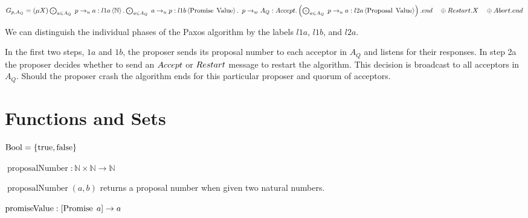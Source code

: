 $G_{p, A_Q} = \left(\mu X\right) \bigodot_{a \in A_Q}\; p \to_u a : l1a \left\langle \mathbb{N} \right\rangle . \bigodot_{a \in A_Q}\; a \to_u p : l1b \left\langle \operatorname{Promise}\; \operatorname{Value} \right\rangle .\\
\hspace*{0.5em}p \to_w A_Q : \mathnormal{Accept}.\left(\bigodot_{a \in A_Q}\; p \to_u a : l2a \left\langle \operatorname{Proposal}\; \operatorname{Value} \right\rangle\right).end\\
\hspace*{1em}\oplus \mathnormal{Restart}.X\\
\hspace*{1em}\oplus \mathnormal{Abort}.end$

We can distinguish the individual phases of the Paxos algorithm by the labels $l1a$, $l1b$, and $l2a$.

In the first two steps, $1a$ and $1b$, the proposer sends its proposal number to each acceptor in $A_Q$ and listens for their responses.
In step 2a the proposer decides whether to send an $\mathnormal{Accept}$ or $\mathnormal{Restart}$ message to restart the algorithm.
This decision is broadcast to all acceptors in $A_Q$.
Should the proposer crash the algorithm ends for this particular proposer and quorum of acceptors.

\section{Functions and Sets}
\newcommand{\Bool}[0]{\operatorname{Bool}}
\newcommand{\True}[0]{\operatorname{true}}
\newcommand{\False}[0]{\operatorname{false}}
\newcommand{\prNumber}[2]{\operatorname{proposalNumber}\left( #1, #2 \right)}
\newcommand{\promValue}[1]{\operatorname{promiseValue}\left(#1\right)}
\newcommand{\anyNack}[1]{\operatorname{anyNack}\left(#1\right)}
\newcommand{\promCount}[1]{\operatorname{promiseCount}\left(#1\right)}
\newcommand{\greaterThan}[2]{\operatorname{gt}\left(#1, #2\right)}
\newcommand{\greaterEqual}[2]{\operatorname{ge}\left(#1, #2\right)}
\newcommand{\nFromPr}[1]{\operatorname{nFromProposal}\left(#1 \right)}
\newcommand{\genAq}[3]{\operatorname{genA_Q}\left(#1, #2, #3\right)}
\newcommand{\update}[2]{\operatorname{update} \left(#1, #2\right)}

$\Bool = \Curly{\True, \False}$

$\operatorname{proposalNumber} : \mathbb{N} \times \mathbb{N} \to \mathbb{N}$

$\prNumber{a}{b}$ returns a proposal number when given two natural numbers.

$\operatorname{promiseValue} : [\operatorname{Promise}\; a] \to a$

